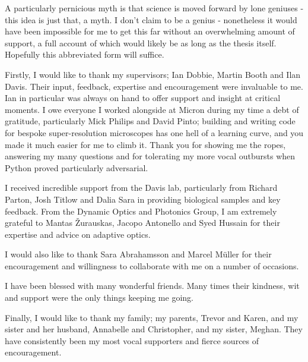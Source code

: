 \begin{acknowledgements}

\vspace{-1.1cm}

A particularly pernicious myth is that science is moved forward by lone geniuses - 
this idea is just that, a myth. I don't claim to be a genius - nonetheless it would 
have been impossible for me to get this far without an overwhelming amount of 
support, a full account of which would likely be as long as the thesis itself. 
Hopefully this abbreviated form  will suffice.

Firstly, I would like to thank my supervisors; Ian Dobbie, Martin Booth and Ilan
Davis. Their input, feedback, expertise and encouragement were invaluable to me. 
Ian in particular was always on hand to offer support and insight at critical 
moments. I owe everyone I worked alongside at Micron during my time a debt 
of gratitude, particularly Mick Philips and David Pinto; building and writing code 
for bespoke super-resolution microscopes has one hell of a learning curve, and 
you made it much easier for me to climb it. Thank you for showing me the ropes,
answering my many questions and for tolerating my more vocal outbursts when 
Python proved particularly adversarial. 

I received incredible support from the Davis lab, particularly from Richard Parton, 
Josh Titlow and Dalia Sara in providing biological samples and key feedback. From 
the Dynamic Optics and Photonics Group, I am extremely grateful to Mantas 
\v{Z}urauskas, Jacopo Antonello and Syed Hussain for their expertise and advice 
on adaptive optics.

I would also like to thank Sara Abrahamsson and Marcel M\"{u}ller for their 
encouragement and willingness to collaborate with me on a number of occasions. 

I have been blessed with many wonderful friends. Many times their kindness, wit and 
support were the only things keeping me going. 

Finally, I would like to thank my family; my parents, Trevor and Karen, and my 
sister and her husband, Annabelle and Christopher, and my sister, Meghan. They
have  consistently been my most vocal supporters and fierce sources of 
encouragement. 

\end{acknowledgements}
